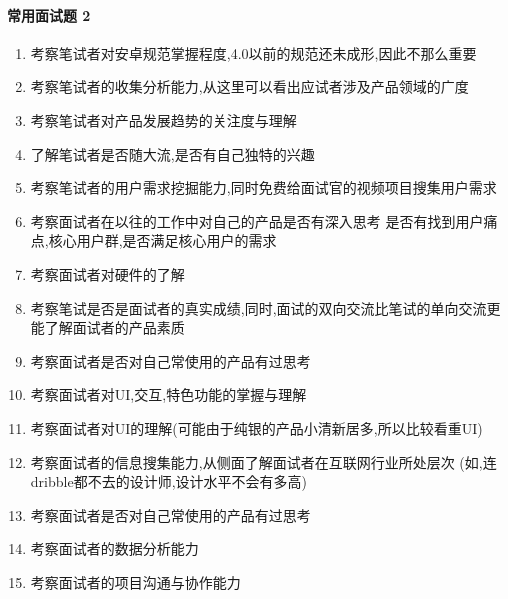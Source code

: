 \documentclass[letterpaper,11pt,english]{sphinxmanual}
\begin{document}
\paragraph{常用面试题 2\sphinxfootnotemark[768]}
\label{\detokenize{chapter_interview/exam:id14}}%
\begin{footnotetext}[768]\sphinxAtStartFootnote
{}
%
\end{footnotetext}\ignorespaces \begin{enumerate}
%
\item {} 
考察笔试者对安卓规范掌握程度,4.0以前的规范还未成形,因此不那么重要

\item {} 
考察笔试者的收集分析能力,从这里可以看出应试者涉及产品领域的广度

\item {} 
考察笔试者对产品发展趋势的关注度与理解

\item {} 
了解笔试者是否随大流,是否有自己独特的兴趣

\item {} 
考察笔试者的用户需求挖掘能力,同时免费给面试官的视频项目搜集用户需求

\item {} 
考察面试者在以往的工作中对自己的产品是否有深入思考
是否有找到用户痛点,核心用户群,是否满足核心用户的需求

\item {} 
考察面试者对硬件的了解

\item {} 
考察笔试是否是面试者的真实成绩,同时,面试的双向交流比笔试的单向交流更能了解面试者的产品素质

\item {} 
考察面试者是否对自己常使用的产品有过思考

\item {} 
考察面试者对UI,交互,特色功能的掌握与理解

\item {} 
考察面试者对UI的理解(可能由于纯银的产品小清新居多,所以比较看重UI)

\item {} 
考察面试者的信息搜集能力,从侧面了解面试者在互联网行业所处层次
(如,连dribble都不去的设计师,设计水平不会有多高)

\item {} 
考察面试者是否对自己常使用的产品有过思考

\item {} 
考察面试者的数据分析能力

\item {} 
考察面试者的项目沟通与协作能力

\end{enumerate}
\end{document}

